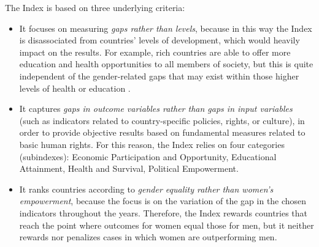 The Index is based on three underlying criteria:
\begin{itemize}
\item It focuses on measuring \textit{gaps rather than levels}, because in this way the Index is disassociated from countries' levels of development, which would heavily impact on the results. For example, rich countries are able to offer more education and health opportunities to all members of society, but this is quite independent of the gender-related gaps that may exist within those higher levels of health or education \cite{schwab2017global}.
\item It captures \textit{gaps in outcome variables rather than gaps in input variables} (such as indicators related to country-specific policies, rights, or culture), in order to provide objective results based on fundamental measures related to basic human rights. For this reason, the Index relies on four categories (subindexes): Economic Participation and Opportunity, Educational Attainment, Health and Survival, Political Empowerment.
\item It ranks countries according to \textit{gender equality rather than women's empowerment}, because the focus is on the variation of the gap in the chosen indicators throughout the years. Therefore, the Index rewards countries that reach the point where outcomes for women equal those for men, but it neither rewards nor penalizes cases in which women are outperforming men.
\end{itemize}

